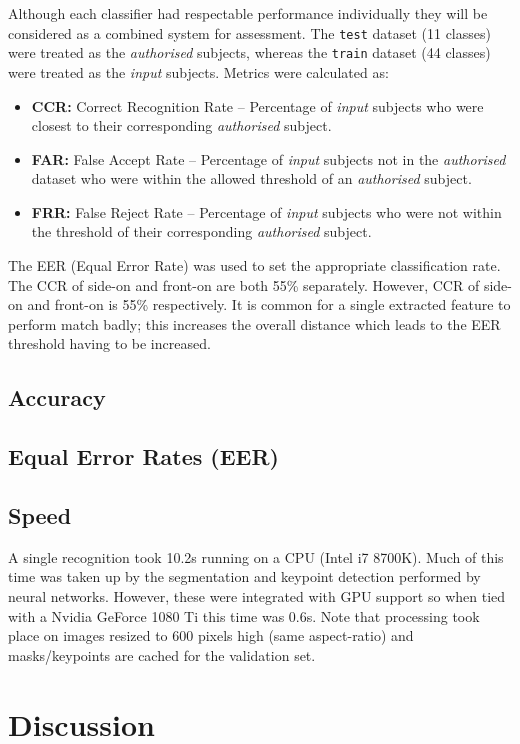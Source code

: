 \documentclass[conference]{IEEEtran} %
\begin{document}
Although each classifier had respectable performance individually they will be considered as a combined system for assessment.
The \texttt{test} dataset (11 classes) were treated as the \textit{authorised} subjects, whereas the \texttt{train} dataset (44 classes) were treated as the \textit{input} subjects. Metrics were calculated as:
\begin{itemize}
  \item \textbf{CCR:} Correct Recognition Rate -- Percentage of \textit{input} subjects who were closest to their corresponding \textit{authorised} subject.
  \item \textbf{FAR:} False Accept Rate -- Percentage of \textit{input} subjects not in the \textit{authorised} dataset who were within the allowed threshold of an \textit{authorised} subject.
  \item \textbf{FRR:} False Reject Rate -- Percentage of \textit{input} subjects who were not within the threshold of their corresponding \textit{authorised} subject.
\end{itemize}
The EER (Equal Error Rate) was used to set the appropriate classification rate.
The CCR of side-on and front-on are both 55\% separately. However, 
CCR of side-on and front-on is 55\% respectively.
It is common for a single extracted feature to perform match badly; this increases the overall distance which leads to the EER threshold having to be increased.
\subsection{Accuracy}

\subsection{Equal Error Rates (EER)}

\subsection{Speed}
\noindent A single recognition took 10.2s running on a CPU (Intel i7 8700K). Much of this time was taken up by the segmentation and keypoint detection performed by neural networks. However, these were integrated with GPU support so when tied with a Nvidia GeForce 1080 Ti this time was 0.6s.
Note that processing took place on images resized to 600 pixels high (same aspect-ratio) and masks/keypoints are cached for the validation set.

\section{Discussion}
\end{document}
